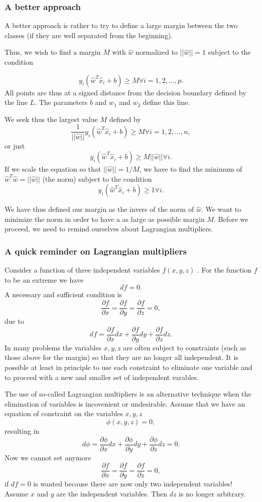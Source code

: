 \documentclass{beamer}
\begin{document}
\begin{frame}
\frametitle{A better approach}

A better approach is rather to try to define a large margin between
the two classes (if they are well separated from the beginning).

Thus, we wish to find a margin $M$ with $\hat{w}$ normalized to
$\vert\vert \hat{w}\vert\vert =1$ subject to the condition

\[
y_i(\hat{w}^T\hat{x}_i+b) \geq M \forall i=1,2,\dots, p. 
\]
All points are thus at a signed distance from the decision boundary defined by the line $L$. The parameters $b$ and $w_1$ and $w_2$ define this line. 

We seek thus the largest value $M$ defined by
\[
\frac{1}{\vert \vert \hat{w}\vert\vert}y_i(\hat{w}^T\hat{x}_i+b) \geq M \forall i=1,2,\dots, n, 
\]
or just 
\[
y_i(\hat{w}^T\hat{x}_i+b) \geq M\vert \vert \hat{w}\vert\vert \forall i. 
\]
If we scale the equation so that $\vert \vert \hat{w}\vert\vert = 1/M$, we have to find the minimum of 
$\hat{w}^T\hat{w}=\vert \vert \hat{w}\vert\vert$ (the norm) subject to the condition
\[
y_i(\hat{w}^T\hat{x}_i+b) \geq 1 \forall i.
\]

We have thus defined our margin as the invers of the norm of $\hat{w}$. We want to minimize the norm in order to have a as large as possible margin $M$. Before we proceed, we need to remind ourselves about Lagrangian multipliers.
\end{frame}

\begin{frame}
\frametitle{A quick reminder on Lagrangian multipliers}

Consider a function of three independent variables $f(x,y,z)$ . For the function $f$ to be an
extreme we have
\[
df=0.
\]
A necessary and sufficient condition is
\[
\frac{\partial f}{\partial x} =\frac{\partial f}{\partial y}=\frac{\partial f}{\partial z}=0,
\]
due to
\[
df = \frac{\partial f}{\partial x}dx+\frac{\partial f}{\partial y}dy+\frac{\partial f}{\partial z}dz.
\]
In many problems the variables $x,y,z$ are often subject to constraints (such as those above for the margin)
so that they are no longer all independent. It is possible at least in principle to use each 
constraint to eliminate one variable
and to proceed with a new and smaller set of independent varables.

The use of so-called Lagrangian  multipliers is an alternative technique  when the elimination
of variables is incovenient or undesirable.  Assume that we have an equation of constraint on 
the variables $x,y,z$
\[
\phi(x,y,z) = 0,
\]
 resulting in
\[
d\phi = \frac{\partial \phi}{\partial x}dx+\frac{\partial \phi}{\partial y}dy+\frac{\partial \phi}{\partial z}dz =0.
\]
Now we cannot set anymore
\[
\frac{\partial f}{\partial x} =\frac{\partial f}{\partial y}=\frac{\partial f}{\partial z}=0,
\]
if $df=0$ is wanted
because there are now only two independent variables!  Assume $x$ and $y$ are the independent 
variables.
Then $dz$ is no longer arbitrary.
\end{frame}
\end{document}
